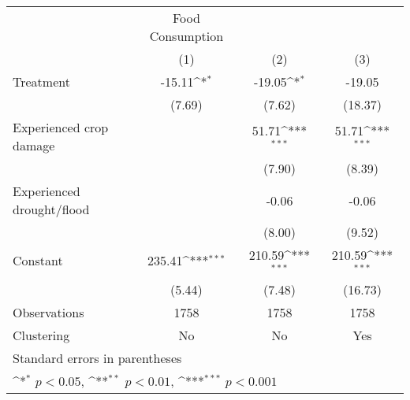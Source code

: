 {
\def\sym#1{\ifmmode^{#1}\else\(^{#1}\)\fi}
\begin{tabular}{l*{3}{c}}
\hline\hline
                    &Food Consumption                                                 \\
                    &\multicolumn{1}{c}{(1)}         &\multicolumn{1}{c}{(2)}         &\multicolumn{1}{c}{(3)}         \\
\hline
Treatment           &      -15.11\sym{*}  &      -19.05\sym{*}  &      -19.05         \\
                    &      (7.69)         &      (7.62)         &     (18.37)         \\
[1em]
Experienced crop damage&                     &       51.71\sym{***}&       51.71\sym{***}\\
                    &                     &      (7.90)         &      (8.39)         \\
[1em]
Experienced drought/flood&                     &       -0.06         &       -0.06         \\
                    &                     &      (8.00)         &      (9.52)         \\
[1em]
Constant            &      235.41\sym{***}&      210.59\sym{***}&      210.59\sym{***}\\
                    &      (5.44)         &      (7.48)         &     (16.73)         \\
\hline
Observations        &        1758         &        1758         &        1758         \\
Clustering          &          No         &          No         &         Yes         \\
\hline\hline
\multicolumn{4}{l}{\footnotesize Standard errors in parentheses}\\
\multicolumn{4}{l}{\footnotesize \sym{*} \(p<0.05\), \sym{**} \(p<0.01\), \sym{***} \(p<0.001\)}\\
\end{tabular}
}
